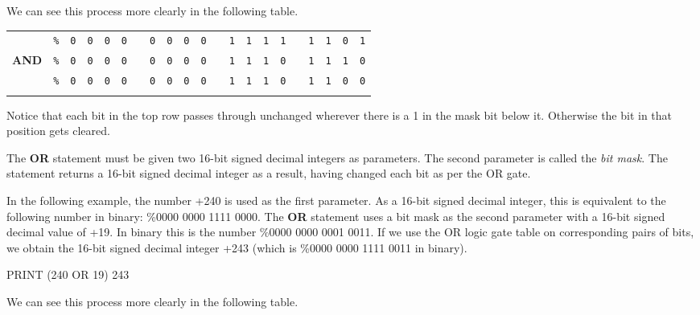 We can see this process more clearly in the following table.

\begin{center}
	\begin{tabular}{ccccccccccccccccccccc}
	  & \texttt{\%} & \texttt{0} & \texttt{0} & \texttt{0} & \texttt{0} & & \texttt{0} & \texttt{0} & \texttt{0} & \texttt{0} & & \texttt{1} & \texttt{1} & \texttt{1} & \texttt{1} & & \texttt{1} & \texttt{1} & \texttt{0} & \texttt{1} \\
	  {\bf AND} & \texttt{\%} & \texttt{0} & \texttt{0} & \texttt{0} & \texttt{0} & & \texttt{0} & \texttt{0} & \texttt{0} & \texttt{0} & & \texttt{1} & \texttt{1} & \texttt{1} & \texttt{0} & & \texttt{1} & \texttt{1} & \texttt{1} & \texttt{0} \\ \hline
	  & \texttt{\%} & \texttt{0} & \texttt{0} & \texttt{0} & \texttt{0} & & \texttt{0} & \texttt{0} & \texttt{0} & \texttt{0} &  & \texttt{1} & \texttt{1} & \texttt{1} & \texttt{0} & & \texttt{1} & \texttt{1} & \texttt{0} & \texttt{0} \\ \hhline{=====================}
	  \end{tabular}
\end{center}

Notice that each bit in the top row passes through unchanged wherever there is a 1 in the mask bit below it. Otherwise the bit in that position gets cleared.

The {\bf OR} statement must be given two 16-bit signed decimal integers as parameters. The second parameter is called the {\it bit mask}. The statement returns a 16-bit signed decimal integer as a result, having changed each bit as per the OR gate.

In the following example, the number +240 is used as the first parameter. As a 16-bit signed decimal integer, this is equivalent to the following number in binary: \%0000 0000 1111 0000. The {\bf OR} statement uses a bit mask as the second parameter with a 16-bit signed decimal value of +19. In binary this is the number \%0000 0000 0001 0011. If we use the OR logic gate table on corresponding pairs of bits, we obtain the 16-bit signed decimal integer +243 (which is \%0000 0000 1111 0011 in binary).
\begin{screenoutput}
PRINT (240 OR 19)
  243
\end{screenoutput}

We can see this process more clearly in the following table.

